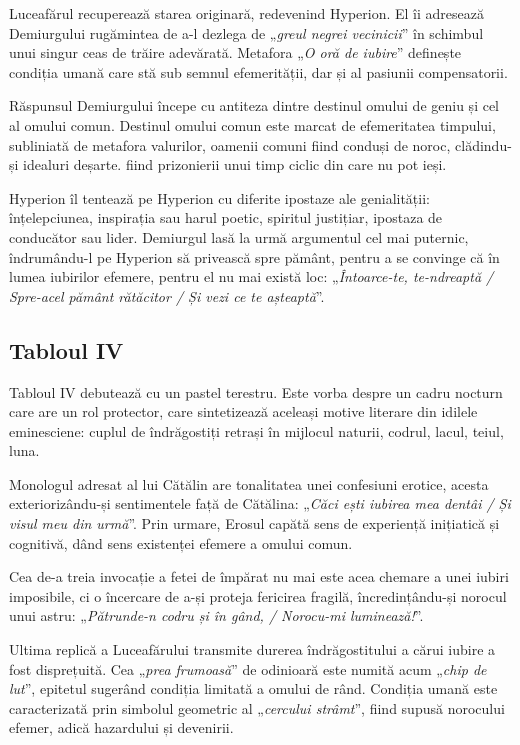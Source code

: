 \documentclass{article}
\newcommand{\qu}[1]{„\emph{#1}”}
\begin{document}
Luceafărul recuperează starea originară, redevenind Hyperion. El îi adresează Demiurgului rugămintea de a-l dezlega de \qu{greul negrei vecinicii} în schimbul unui singur ceas de trăire adevărată. Metafora \qu{O oră de iubire} definește condiția umană care stă sub semnul efemerității, dar și al pasiunii compensatorii.

Răspunsul Demiurgului începe cu antiteza dintre destinul omului de geniu și cel al omului comun. Destinul omului comun este marcat de efemeritatea timpului, subliniată de metafora valurilor, oamenii comuni fiind conduși de noroc, clădindu-și idealuri deșarte. fiind prizonierii unui timp ciclic din care nu pot ieși.

Hyperion îl tentează pe Hyperion cu diferite ipostaze ale genialității: înțelepciunea, inspirația sau harul poetic, spiritul justițiar, ipostaza de conducător sau lider. Demiurgul lasă la urmă argumentul cel mai puternic, îndrumându-l pe Hyperion să privească spre pământ, pentru a se convinge că în lumea iubirilor efemere, pentru el nu mai există loc: \qu{Întoarce-te, te-ndreaptă / Spre-acel pământ rătăcitor / Și vezi ce te așteaptă}.

\subsection{Tabloul IV}
Tabloul IV debutează cu un pastel terestru. Este vorba despre un cadru nocturn care are un rol protector, care sintetizează aceleași motive literare din idilele eminesciene: cuplul de îndrăgostiți retrași în mijlocul naturii, codrul, lacul, teiul, luna.

Monologul adresat al lui Cătălin are tonalitatea unei confesiuni erotice, acesta exteriorizându-și sentimentele față de Cătălina: \qu{Căci ești iubirea mea dentâi / Și visul meu din urmă}. Prin urmare, Erosul capătă sens de experiență inițiatică și cognitivă, dând sens existenței efemere a omului comun.

Cea de-a treia invocație a fetei de împărat nu mai este acea chemare a unei iubiri imposibile, ci o încercare de a-și proteja fericirea fragilă, încredințându-și norocul unui astru: \qu{Pătrunde-n codru și în gând, / Norocu-mi luminează!}.

Ultima replică a Luceafărului transmite durerea îndrăgostitului a cărui iubire a fost disprețuită. Cea \qu{prea frumoasă} de odinioară este numită acum \qu{chip de lut}, epitetul sugerând condiția limitată a omului de rând. Condiția umană este caracterizată prin simbolul geometric al \qu{cercului strâmt}, fiind supusă norocului efemer, adică hazardului și devenirii.
\end{document}
